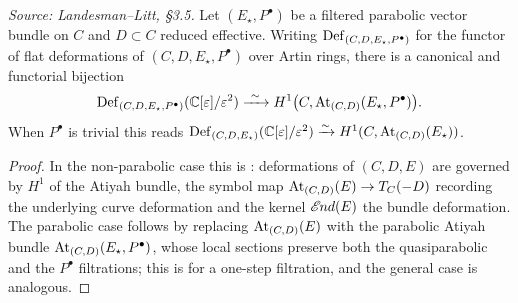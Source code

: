 \begin{proposition}
  \label{prop:filtered-bundle-deformation}
  \textit{Source: Landesman--Litt, \S3.5.}
  Let $(E_\star,P^\bullet)$ be a filtered parabolic vector bundle on $C$ and
  $D \subset C$ reduced effective. Writing $\operatorname{Def}_{(C,D,E_\star,P^\bullet)}$
  for the functor of flat deformations of $(C,D,E_\star,P^\bullet)$ over Artin
  rings, there is a canonical and functorial bijection
  \[
    \operatorname{Def}_{(C,D,E_\star,P^\bullet)}(\mathbb{C}[\varepsilon]/\varepsilon^2)
    \xrightarrow{\ \sim\ } H^1\bigl(C, \operatorname{At}_{(C,D)}(E_\star,P^\bullet)\bigr).
  \]
  When $P^\bullet$ is trivial this reads
  $\operatorname{Def}_{(C,D,E_\star)}(\mathbb{C}[\varepsilon]/\varepsilon^2) \xrightarrow{\sim}
  H^1(C, \operatorname{At}_{(C,D)}(E_\star))$.
\end{proposition}
\begin{proof}
  In the non-parabolic case this is \cite[\S2.2]{BHH:logarithmic}: deformations of
  $(C,D,E)$ are governed by $H^1$ of the Atiyah bundle, the symbol map
  $\operatorname{At}_{(C,D)}(E) \to T_C(-D)$ recording the underlying curve deformation and
  the kernel $\mathscr{E}\kern -1pt nd(E)$ the bundle deformation. The parabolic case follows by
  replacing $\operatorname{At}_{(C,D)}(E)$ with the parabolic Atiyah bundle
  $\operatorname{At}_{(C,D)}(E_\star,P^\bullet)$, whose local sections preserve both the
  quasiparabolic and the $P^\bullet$ filtrations; this is
  \cite[Lemma 3.2]{BHH:parabolic} for a one-step filtration, and the general case
  is analogous.
\end{proof}

